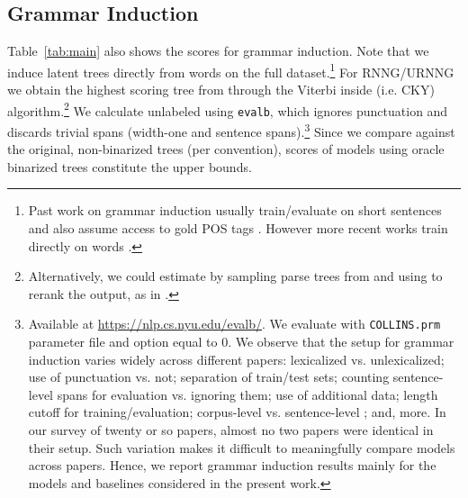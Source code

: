 \documentclass[11pt,a4paper]{article}
\begin{document}
\subsection{Grammar Induction}
\vspace{-1mm}
Table~\ref{tab:main} also shows the  scores for grammar induction. Note that we induce latent trees directly from words on the full dataset.\footnote{Past work on grammar induction usually train/evaluate on short sentences and also assume access to gold POS tags \cite{klein2002ccm,smith2004,bod2006subtrees}. However more recent works train directly on words \cite{jin2018depth,shen2018nlm,drozdov2018latent}.}
For RNNG/URNNG we obtain the highest scoring tree from  through the Viterbi inside (i.e. CKY) algorithm.\footnote{Alternatively, we could estimate  by sampling parse trees from  and using  to rerank the output, as in \citet{dyer2016rnng}.}
We calculate unlabeled  using \texttt{evalb}, which
ignores punctuation and discards trivial spans (width-one and sentence spans).\footnote{Available at \url{https://nlp.cs.nyu.edu/evalb/}. We evaluate with  \texttt{COLLINS.prm} parameter file and  option equal to 0. We observe that the setup for grammar induction varies widely across different papers: lexicalized vs. unlexicalized; use of punctuation
vs. not; separation of train/test sets; counting sentence-level spans for evaluation vs. ignoring them; use of additional data; length cutoff for training/evaluation; corpus-level  vs. sentence-level ; and, more. In our survey of twenty or so papers, almost no two papers were identical in their setup. Such variation makes it difficult to meaningfully compare models across papers. Hence, we report grammar induction results mainly for the models and baselines considered in the present work.} Since we compare  against the original, non-binarized trees
(per convention),  scores of models using oracle binarized trees constitute the upper bounds.
\end{document}
